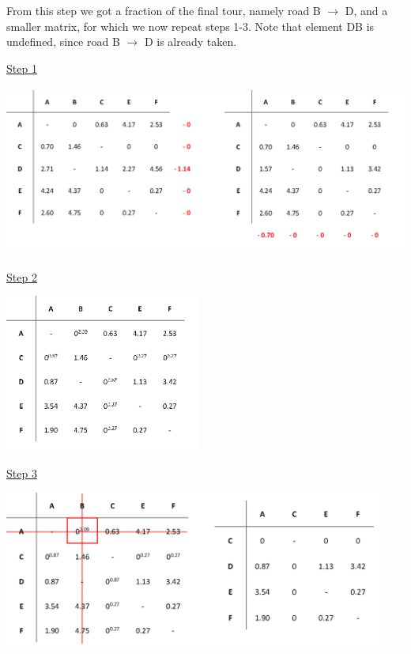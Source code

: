 \noindent
From this step we got a fraction of the final tour, namely road B $\rightarrow$ D, and a smaller matrix, for which we now repeat steps 1-3. Note that element DB is undefined, since road B $\rightarrow$ D is already taken.
	

\vspace{5mm}
\underline{Step 1}

\begin{center}
	\includegraphics[height=5.6cm]{2red0} 
\end{center}	

\vspace{-3mm}
\underline{Step 2}

\begin{center}
	\includegraphics[height=5.2cm]{2pen}
\end{center}	
	
	
\underline{Step 3}

\begin{center}
	\includegraphics[height=5.2cm]{2elim3}
\end{center}

